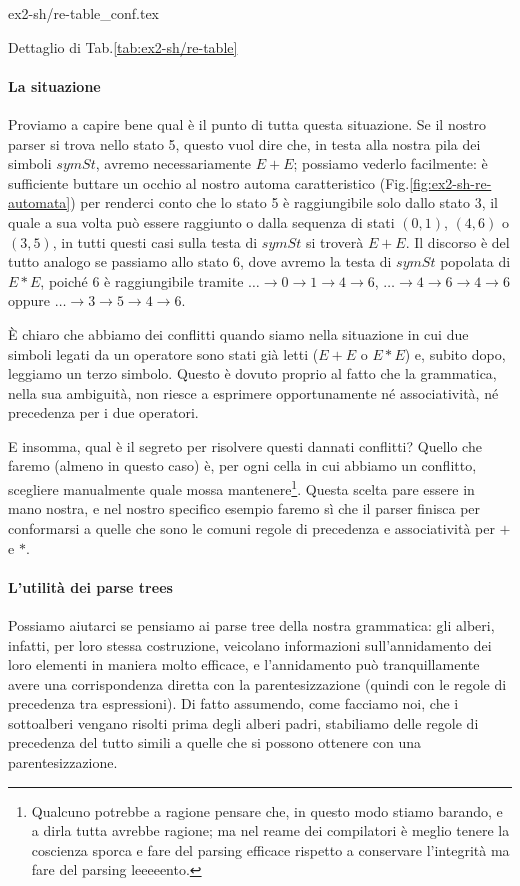 \documentclass[class=book, crop=false, oneside, 12pt]{standalone}
\begin{document}
\begin{table}[H]
    \centering
    {ex2-sh/re-table_conf.tex}
    \caption{Dettaglio di Tab.\ref{tab:ex2-sh/re-table}}
    \label{tab:ex2-sh/re-table_conf}
\end{table}

\paragraph{La situazione}
Proviamo a capire bene qual è il punto di tutta questa situazione. Se il nostro parser si trova nello stato 5, questo vuol dire che, in testa alla nostra pila dei simboli \(symSt\), avremo necessariamente \(E + E\); possiamo vederlo facilmente: è sufficiente buttare un occhio al nostro automa caratteristico (Fig.\ref{fig:ex2-sh-re-automata}) per renderci conto che lo stato 5 è raggiungibile solo dallo stato \(3\), il quale a sua volta può essere raggiunto o dalla sequenza di stati \((0, 1)\), \((4, 6)\) o \((3, 5)\), in tutti questi casi sulla testa di \(symSt\) si troverà \(E + E\). Il discorso è del tutto analogo se passiamo allo stato 6, dove avremo la testa di \(symSt\) popolata di \(E * E\), poiché 6 è raggiungibile tramite \(\dots \to 0 \to 1 \to 4 \to 6\), \(\dots \to 4 \to 6 \to 4 \to 6\) oppure \(\dots \to 3 \to 5 \to 4 \to 6\).

È chiaro che abbiamo dei conflitti quando siamo nella situazione in cui due simboli legati da un operatore sono stati già letti (\(E + E\) o \(E * E\)) e, subito dopo, leggiamo un terzo simbolo. Questo è dovuto proprio al fatto che la grammatica, nella sua ambiguità, non riesce a esprimere opportunamente né associatività, né precedenza per i due operatori.

E insomma, qual è il segreto per risolvere questi dannati conflitti? Quello che faremo (almeno in questo caso) è, per ogni cella in cui abbiamo un conflitto, scegliere manualmente quale mossa mantenere\footnote{Qualcuno potrebbe a ragione pensare che, in questo modo stiamo barando, e a dirla tutta avrebbe ragione; ma nel reame dei compilatori è meglio tenere la coscienza sporca e fare del parsing efficace  rispetto a conservare l'integrità ma fare del parsing leeeeento.}. Questa scelta pare essere in mano nostra, e nel nostro specifico esempio faremo sì che il parser finisca per conformarsi a quelle che sono le comuni regole di precedenza e associatività per \(+\) e \(*\). 

\paragraph{L'utilità dei parse trees}
Possiamo aiutarci se pensiamo ai parse tree della nostra grammatica: gli alberi, infatti, per loro stessa costruzione, veicolano informazioni sull'annidamento dei loro elementi in maniera molto efficace, e l'annidamento può tranquillamente avere una corrispondenza diretta con la parentesizzazione (quindi con le regole di precedenza tra espressioni). Di fatto assumendo, come facciamo noi, che i sottoalberi vengano risolti prima degli alberi padri, stabiliamo delle regole di precedenza del tutto simili a quelle che si possono ottenere con una parentesizzazione.
\end{document}
